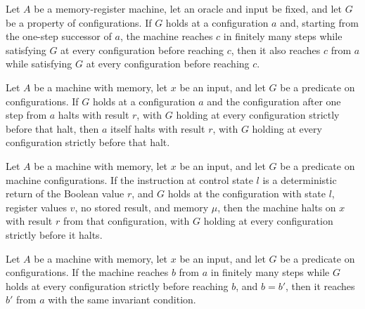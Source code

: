 \begin{lemma}
\label{Complexity.LogProg.MReach.step}
\leanok
{}
Let $A$ be a memory-register machine, let an oracle and input be fixed, and let $G$ be a
property of configurations. If $G$ holds at a configuration $a$ and, starting from the
one-step successor of $a$, the machine reaches $c$ in finitely many steps while
satisfying $G$ at every configuration before reaching $c$, then it also reaches $c$ from
$a$ while satisfying $G$ at every configuration before reaching $c$.
\end{lemma}

\begin{lemma}
\label{Complexity.LogProg.MHalt.step}
\leanok
{}
Let $A$ be a machine with memory, let $x$ be an input, and let $G$ be a predicate on
configurations. If $G$ holds at a configuration $a$ and the configuration after one step
from $a$ halts with result $r$, with $G$ holding at every configuration strictly before
that halt, then $a$ itself halts with result $r$, with $G$ holding at every
configuration strictly before that halt.
\end{lemma}

\begin{lemma}
\label{Complexity.LogProg.MHalt.ret}
\leanok
{}
Let $A$ be a machine with memory, let $x$ be an input, and let $G$ be a predicate on
machine configurations. If the instruction at control state $l$ is a deterministic
return of the Boolean value $r$, and $G$ holds at the configuration with state $l$,
register values $v$, no stored result, and memory $\mu$, then the machine halts on
$x$ with result $r$ from that configuration, with $G$ holding at every configuration
strictly before it halts.
\end{lemma}

\begin{lemma}
\label{Complexity.LogProg.MReach.of_eq}
\leanok
{}
Let $A$ be a machine with memory, let $x$ be an input, and let $G$ be a predicate on
configurations. If the machine reaches $b$ from $a$ in finitely many steps while $G$
holds at every configuration strictly before reaching $b$, and $b=b'$, then it reaches
$b'$ from $a$ with the same invariant condition.
\end{lemma}

